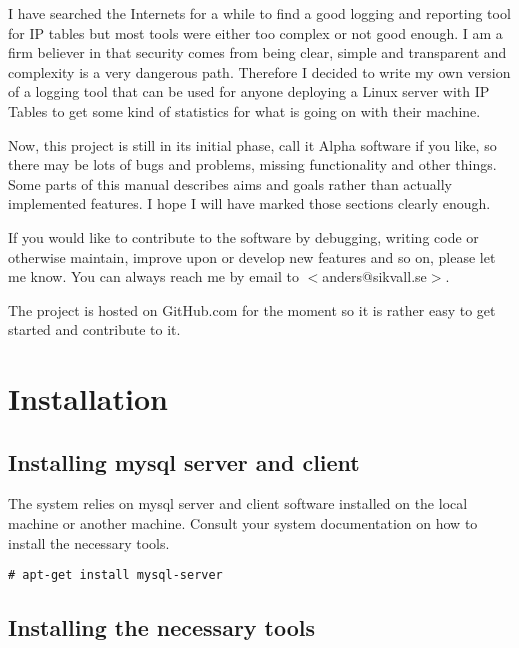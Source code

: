 \documentclass[12pt,a4paper]{report}
\begin{document}
I have searched the Internets for a while to find a good logging and reporting tool for IP tables but most tools were either too complex or not good enough. I am a firm believer in that security comes from being clear, simple and transparent and complexity is a very dangerous path. Therefore I decided to write my own version of a logging tool that can be used for anyone deploying a Linux server with IP Tables to get some kind of statistics for what is going on with their machine. 
 
Now, this project is still in its initial phase, call it Alpha software if you like, so there may be lots of bugs and problems, missing functionality and other things. Some parts of this manual describes aims and goals rather than actually implemented features. I hope I will have marked those sections clearly enough. 

If you would like to contribute to the software by debugging, writing code or otherwise maintain, improve upon or develop new features and so on, please let me know. You can always reach me by email to 
$<$anders@sikvall.se$>$.

The project is hosted on GitHub.com for the moment so it is rather easy to get started and contribute to it.







\chapter{Installation}

\section{Installing mysql server and client}

The system relies on mysql server and client software installed on the local machine or another machine. Consult your system documentation on how to install the necessary tools.

\begin{verbatim}
# apt-get install mysql-server
\end{verbatim}

\section{Installing the necessary tools}
\end{document}
